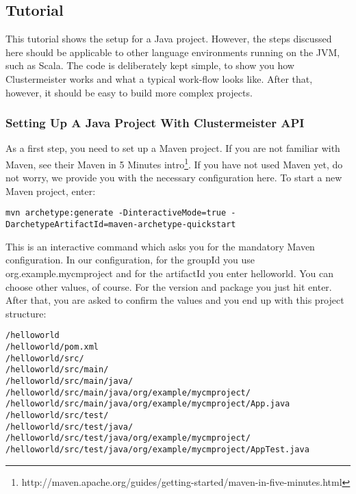 \documentclass[english]{uzhpub}
\begin{document}
\subsection{Tutorial}

This tutorial shows the setup for a Java project. However, the steps discussed here should be applicable to other language environments running on the JVM, such as Scala. The code is deliberately kept simple, to show you how Clustermeister works and what a typical work-flow looks like. After that, however, it should be easy to build more complex projects.

\subsubsection{Setting Up A Java Project With Clustermeister API}

As a first step, you need to set up a Maven project. If you are not familiar with Maven, see their Maven in 5 Minutes intro\footnote{http://maven.apache.org/guides/getting-started/maven-in-five-minutes.html}. 
If you have not used Maven yet, do not worry, we provide you with the necessary configuration here. To start a new Maven project, enter:

\begin{lstlisting}[breaklines=true]
 mvn archetype:generate -DinteractiveMode=true -DarchetypeArtifactId=maven-archetype-quickstart
\end{lstlisting}

This is an interactive command which asks you for the mandatory Maven configuration. In our configuration, for the groupId you use org.example.mycmproject and for the artifactId you enter helloworld. You can choose other values, of course. For the version and package you just hit enter. After that, you are asked to confirm the values and you end up with this project structure:

\begin{lstlisting}[breaklines=true]
/helloworld
/helloworld/pom.xml
/helloworld/src/
/helloworld/src/main/
/helloworld/src/main/java/
/helloworld/src/main/java/org/example/mycmproject/
/helloworld/src/main/java/org/example/mycmproject/App.java
/helloworld/src/test/
/helloworld/src/test/java/
/helloworld/src/test/java/org/example/mycmproject/
/helloworld/src/test/java/org/example/mycmproject/AppTest.java
\end{lstlisting}




\end{document}
